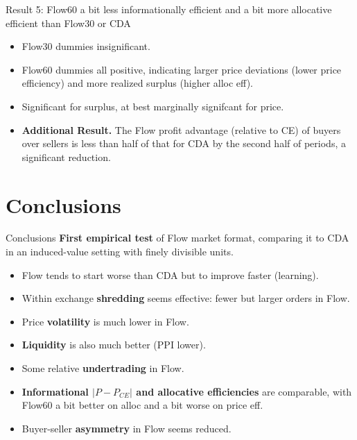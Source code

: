 \documentclass[10pt]{beamer}
\begin{document}
\begin{frame}{Result 5: Flow60 a bit less informationally efficient and a bit more allocative efficient than Flow30 or CDA}
\begin{itemize}
\item Flow30 dummies insignificant.  
\item Flow60 dummies all positive, indicating larger price deviations (lower price efficiency) and more realized surplus (higher alloc eff). 

\item Significant for surplus, at best marginally signifcant for price. \pause
\vspace{1cm}
\item \textbf{Additional Result.} The Flow profit advantage (relative to CE) of buyers over sellers is less than half of that for CDA by the second half of periods, a significant reduction. 
\end{itemize}   

\end{frame}





\section{Conclusions}

\begin{frame}{Conclusions}
\textbf{First empirical test} of Flow market format, comparing it to CDA in an induced-value setting with finely divisible units. \pause
\begin{itemize}
\item Flow tends to start worse than CDA but to improve faster (learning).
\item Within exchange \textbf{shredding} seems effective: fewer but larger orders in Flow. %
\item Price \textbf{volatility} is much lower in Flow. 
\item \textbf{Liquidity} is also much better (PPI lower). \pause
\item Some relative \textbf{undertrading} in Flow.
\item \textbf{Informational  $|P-P_{CE}|$ and allocative efficiencies} are comparable,
with Flow60 a bit better on alloc and a bit worse on price eff. \pause
\item Buyer-seller \textbf{asymmetry} in Flow seems reduced.\pause
\end{itemize} 
\end{frame}
\end{document}
